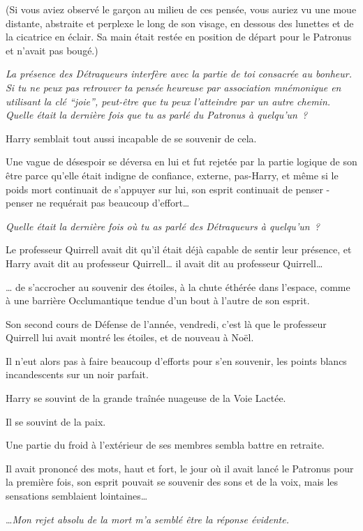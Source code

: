 (Si vous aviez observé le garçon au milieu de ces pensée, vous auriez vu une moue distante, abstraite et perplexe le long de son visage, en dessous des lunettes et de la cicatrice en éclair. Sa main était restée en position de départ pour le Patronus et n'avait pas bougé.)

\emph{La présence des Détraqueurs interfère avec la partie de toi consacrée au bonheur. Si tu ne peux pas retrouver ta pensée heureuse par association mnémonique en utilisant la clé “joie”, peut-être que tu peux l'atteindre par un autre chemin. Quelle était la dernière fois que tu as parlé du Patronus à quelqu'un~?}

Harry semblait tout aussi incapable de se souvenir de cela.

Une vague de désespoir se déversa en lui et fut rejetée par la partie logique de son être parce qu'elle était indigne de confiance, externe, pas-Harry, et même si le poids mort continuait de s'appuyer sur lui, son esprit continuait de penser - penser ne requérait pas beaucoup d'effort…

\emph{Quelle était la dernière fois où tu as parlé des Détraqueurs à quelqu'un~?}

Le professeur Quirrell avait dit qu'il était déjà capable de sentir leur présence, et Harry avait dit au professeur Quirrell… il avait dit au professeur Quirrell…

… de s'accrocher au souvenir des étoiles, à la chute éthérée dans l'espace, comme à une barrière Occlumantique tendue d'un bout à l'autre de son esprit.

Son second cours de Défense de l'année, vendredi, c'est là que le professeur Quirrell lui avait montré les étoiles, et de nouveau à Noël.

Il n'eut alors pas à faire beaucoup d'efforts pour s'en souvenir, les points blancs incandescents sur un noir parfait.

Harry se souvint de la grande traînée nuageuse de la Voie Lactée.

Il se souvint de la paix.

Une partie du froid à l'extérieur de ses membres sembla battre en retraite.

Il avait prononcé des mots, haut et fort, le jour où il avait lancé le Patronus pour la première fois, son esprit pouvait se souvenir des sons et de la voix, mais les sensations semblaient lointaines…

…\emph{Mon rejet absolu de la mort m'a semblé être la réponse évidente.}

